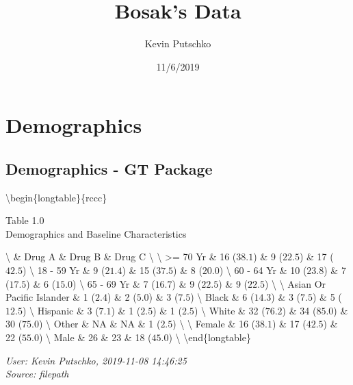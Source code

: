 \documentclass[]{article}
\title{Bosak's Data}
\author{Kevin Putschko}
\date{11/6/2019}
\begin{document}
\maketitle

\hypertarget{demographics}{%
\section{Demographics}\label{demographics}}

\hypertarget{demographics---gt-package}{%
\subsection{Demographics - GT Package}\label{demographics---gt-package}}

\captionsetup[table]{labelformat=empty,skip=1pt}

\textbackslash begin\{longtable\}\{rccc\}

\caption*{
\large Table 1.0\\ 
\small Demographics and Baseline Characteristics\\ 
}

\textbackslash{} \toprule \& Drug A \& Drug B \& Drug C \textbackslash{}
\midrule {} \textbackslash{} \midrule
\textgreater= 70 Yr \& 16 (\(38.1%
\)) \& 9 (\(22.5%
\)) \& 17 (\(42.5%
\)) \textbackslash{} 18 - 59 Yr \& 9 (\(21.4%
\)) \& 15 (\(37.5%
\)) \& 8 (\(20.0%
\)) \textbackslash{} 60 - 64 Yr \& 10 (\(23.8%
\)) \& 7 (\(17.5%
\)) \& 6 (\(15.0%
\)) \textbackslash{} 65 - 69 Yr \& 7 (\(16.7%
\)) \& 9 (\(22.5%
\)) \& 9 (\(22.5%
\)) \textbackslash{} \midrule {} \textbackslash{}
\midrule Asian Or Pacific Islander \& 1 (\(2.4%
\)) \& 2 (\(5.0%
\)) \& 3 (\(7.5%
\)) \textbackslash{} Black \& 6 (\(14.3%
\)) \& 3 (\(7.5%
\)) \& 5 (\(12.5%
\)) \textbackslash{} Hispanic \& 3 (\(7.1%
\)) \& 1 (\(2.5%
\)) \& 1 (\(2.5%
\)) \textbackslash{} White \& 32 (\(76.2%
\)) \& 34 (\(85.0%
\)) \& 30 (\(75.0%
\)) \textbackslash{} Other \& NA \& NA \& 1 (\(2.5%
\)) \textbackslash{} \midrule {} \textbackslash{}
\midrule Female \& 16 (\(38.1%
\)) \& 17 (\(42.5%
\)) \& 22 (\(55.0%
\)) \textbackslash{} Male \& 26 \& 23 \& 18 (\(45.0%
\)) \textbackslash{} \bottomrule \textbackslash end\{longtable\}

\begin{minipage}{\linewidth}
\emph{User: Kevin Putschko, 2019-11-08 14:46:25}\\ 
\emph{Source: filepath}\\ 
\end{minipage}
\end{document}
